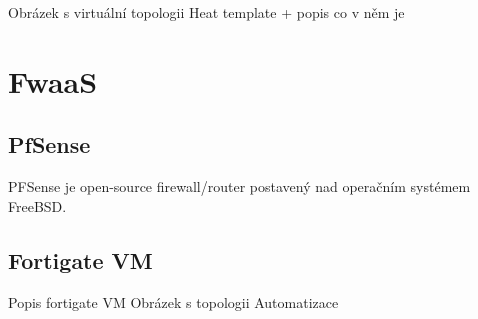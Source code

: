 Obrázek s virtuální topologii
Heat template + popis co v něm je

\section{FwaaS}\label{sub:interaction}

\subsection{PfSense}\label{sub:interaction}

PFSense je open-source firewall/router postavený nad operačním systémem FreeBSD.

\subsection{Fortigate VM}\label{sub:interaction}

Popis fortigate VM
Obrázek s topologii
Automatizace

